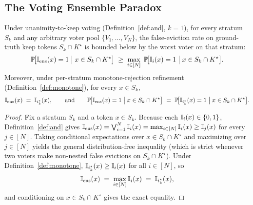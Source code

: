 \subsection{The Voting Ensemble Paradox}
\label{sec:paradox}

\begin{theorem}
\label{thm:paradox}
Under unanimity-to-keep voting (Definition~\ref{def:and}, $k{=}1$), for every
stratum $S_k$ and any arbitrary voter pool $\{V_1,\dots,V_N\}$, the false-eviction
rate on ground-truth keep tokens $S_k \cap K^{\star}$ is bounded below by the
worst voter on that stratum:
\[
  \mathbb{P}\!\bigl[\mathbb{I}_{\mathrm{ens}}(x)=1 \;\big|\; x\in S_k\cap K^{\star}\bigr]
  \;\ge\;
  \max_{i\in[N]}\;\mathbb{P}\!\bigl[\mathbb{I}_i(x)=1 \;\big|\; x\in S_k\cap K^{\star}\bigr].
\]
Moreover, under per-stratum monotone-rejection refinement
(Definition~\ref{def:monotone}), for every $x \in S_k$,
\[
  \mathbb{I}_{\mathrm{ens}}(x) \;=\; \mathbb{I}_{i^{\star}_k}(x),
  \qquad\text{and}\qquad
  \mathbb{P}\!\bigl[\mathbb{I}_{\mathrm{ens}}(x)=1 \;\big|\; x\in S_k\cap K^{\star}\bigr]
  \;=\;
  \mathbb{P}\!\bigl[\mathbb{I}_{i^{\star}_k}(x)=1 \;\big|\; x\in S_k\cap K^{\star}\bigr].
\]
\end{theorem}

\begin{proof}
Fix a stratum $S_k$ and a token $x \in S_k$. Because each $\mathbb{I}_i(x)\in\{0,1\}$,
Definition~\ref{def:and} gives
$\mathbb{I}_{\mathrm{ens}}(x) = \bigvee_{i=1}^{N}\mathbb{I}_i(x) = \max_{i\in[N]}\mathbb{I}_i(x) \ge \mathbb{I}_j(x)$
for every $j\in[N]$. Taking conditional expectations over $x\in S_k\cap K^{\star}$
and maximizing over $j\in[N]$ yields the general distribution-free inequality
(which is strict whenever two voters make non-nested false evictions on
$S_k\cap K^{\star}$). Under Definition~\ref{def:monotone},
$\mathbb{I}_{i^{\star}_k}(x) \ge \mathbb{I}_i(x)$ for all $i\in[N]$, so
\[
  \mathbb{I}_{\mathrm{ens}}(x)
  \;=\; \max_{i\in[N]} \mathbb{I}_i(x)
  \;=\; \mathbb{I}_{i^{\star}_k}(x),
\]
and conditioning on $x \in S_k \cap K^{\star}$ gives the exact equality.
\end{proof}

